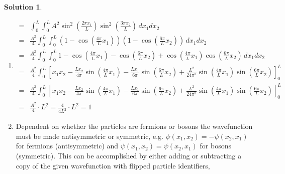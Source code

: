 \documentclass[10pt]{article}
\theoremstyle{definition}
\newtheorem{soln}{Solution}
\begin{document}
\begin{soln}~
  \begin{enumerate}[label=(\alph*)]
    \item \begin{align*}
            = & \int_{0}^{L}\int_{0}^{L}A^2\sin^2\left(\frac{2\pi x_1}{L}\right)\sin^2\left(\frac{3\pi x_2}{L}\right)\,dx_1dx_2                                                                             \\
            = & \frac{A^2}{4}\int_{0}^{L}\int_{0}^{L}\left(1-\cos\left(\frac{4\pi}{L}x_1\right)\right)\left(1-\cos\left(\frac{6\pi}{L}x_2\right)\right)\,dx_1dx_2                                           \\
            = & \frac{A^2}{4}\int_{0}^{L}\int_{0}^{L}1-\cos\left(\frac{4\pi}{L}x_1\right)-\cos\left(\frac{6\pi}{L}x_2\right)+\cos\left(\frac{4\pi}{L}x_1\right)\cos\left(\frac{6\pi}{L}x_2\right)\,dx_1dx_2 \\
            = & \frac{A^2}{4}\int_{0}^{L}\left[x_1x_2-\frac{Lx_2}{4\pi}\sin\left(\frac{4\pi}{L}x_1\right)
              -\frac{Lx_1}{6\pi}\sin\left(\frac{6\pi}{L}x_2\right)
              + \frac{L^2}{24\pi^2}\sin\left(\frac{4\pi}{L}x_1\right)\sin\left(\frac{6\pi}{L}x_2\right)
            \right]_0^L                                                                                                                                                                                     \\
            = & \frac{A^2}{4}\int_{0}^{L}\left[x_1x_2-\frac{Lx_2}{4\pi}\sin\left(\frac{4\pi}{L}x_1\right)
              -\frac{Lx_1}{6\pi}\sin\left(\frac{6\pi}{L}x_2\right)
              + \frac{L^2}{24\pi^2}\sin\left(\frac{4\pi}{L}x_1\right)\sin\left(\frac{6\pi}{L}x_2\right)
            \right]_0^L                                                                                                                                                                                     \\
            = & \frac{A^2}{4}\cdot L^2=\frac{4}{4L^2}\cdot L^2=1
          \end{align*}
    \item Dependent on whether the particles are fermions or bosons the wavefunction must be made antisymmetric or symmetric,
          e.g. $\psi(x_1,x_2)=-\psi(x_2,x_1)$ for fermions (antisymmetric) and $\psi(x_1,x_2)=\psi(x_2,x_1)$ for bosons (symmetric).
          This can be accomplished by either adding or subtracting a copy of the given wavefunction with flipped particle identifiers,
          \begin{align*}

\end{align*}
\end{enumerate}
\end{soln}
\end{document}
